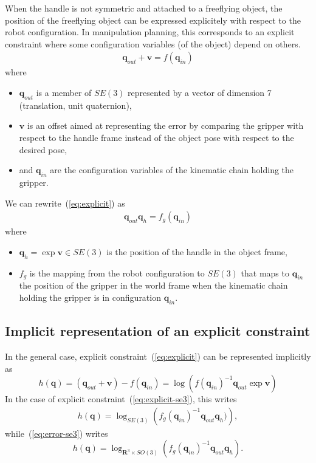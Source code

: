 \documentclass {article}
\newcommand\conf{\mathbf{q}}
\newcommand\reals{\mathbf{R}}
\newcommand\logRSO{\log_{\reals^3\times SO(3)}}
\newcommand\logSE{\log_{SE(3)}}
\begin{document}
When the handle is not symmetric and attached to a freeflying object, the position of the freeflying object can be expressed explicitely with respect to the robot configuration. In manipulation planning, this corresponds to an explicit constraint where some configuration variables (of the object) depend on others.
\begin {eqnarray}\label{eq:explicit}
  \conf_{out} + \mathbf{v} = f (\conf_{in})
\end {eqnarray}
where
\begin{itemize}
  \item $\conf_{out}$ is a member of $SE(3)$ represented by a vector of
    dimension 7 (translation, unit quaternion),
  \item $\mathbf{v}$ is an offset aimed at representing the error by comparing the gripper with respect to the handle frame instead of the object pose with respect to the desired pose,
  \item and $\conf_{in}$ are the configuration variables of the kinematic chain holding the gripper.
\end {itemize}
We can rewrite~(\ref{eq:explicit}) as
\begin {eqnarray}\label{eq:explicit-se3}
  \conf_{out} \conf_{h} = f_{g} (\conf_{in})
\end {eqnarray}
where
\begin {itemize}
\item $\conf_{h} = \exp \mathbf{v}\in SE(3)$ is the position of the handle in the object frame,
\item $f_{g}$ is the mapping from the robot configuration to $SE(3)$ that maps to $\conf_{in}$ the position of the gripper in the world frame when the kinematic chain holding the gripper is in configuration $\conf_{in}$.
\end{itemize}

\subsection {Implicit representation of an explicit constraint}

In the general case, explicit constraint~(\ref{eq:explicit}) can be represented implicitly as
$$
h (\conf) = (\conf_{out} + \mathbf{v}) - f (\conf_{in}) = \log (f (\conf_{in})^{-1} \conf_{out} \exp \mathbf{v})
$$
In the case of explicit constraint~(\ref{eq:explicit-se3}), this writes
\begin{eqnarray}\label{eq:explicit-se3-2}
h (\conf) = \logSE \left(f_{g} (\conf_{in})^{-1}\conf_{out}\conf_{h})\right),
\end{eqnarray}
while~(\ref{eq:error-se3}) writes
$$
h (\conf) = \logRSO \left(f_{g} (\conf_{in})^{-1}\conf_{out}\conf_{h}\right).
$$
\end{document}

